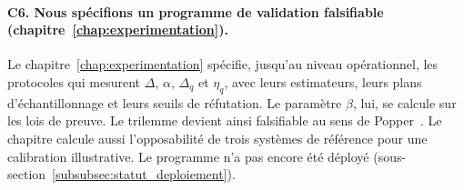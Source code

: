 \begin{sloppypar}
\paragraph{C6. Nous sp\'ecifions un programme de validation falsifiable
(chapitre~\ref{chap:experimentation}).}
Le chapitre~\ref{chap:experimentation} sp\'ecifie, jusqu'au niveau op\'erationnel, les protocoles qui mesurent $\Delta$, $\alpha$, $\Delta_q$ et $\eta_q$, avec leurs estimateurs, leurs plans d'\'echantillonnage et leurs seuils de r\'efutation. Le param\`etre $\beta$, lui, se calcule sur les lois de preuve. Le trilemme devient ainsi falsifiable au sens de Popper~\cite{Popper1934}. Le chapitre calcule aussi l'opposabilit\'e de trois syst\`emes de r\'ef\'erence pour une calibration illustrative. Le programme n'a pas encore \'et\'e d\'eploy\'e (sous-section~\ref{subsubsec:statut_deploiement}).

\end{sloppypar}


